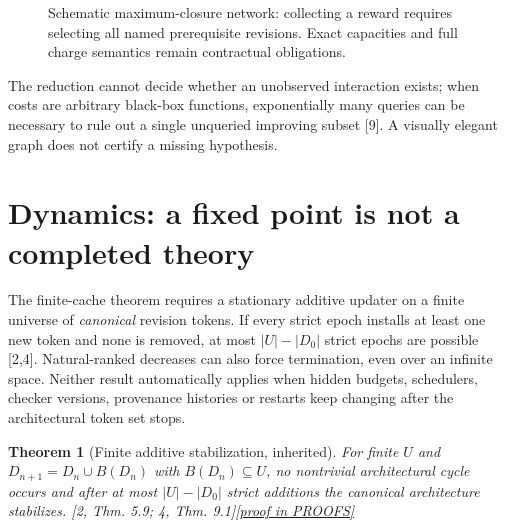 \documentclass[11pt,letterpaper]{article}
\newtheorem{theorem}{Theorem}[section]
\theoremstyle{definition}
\theoremstyle{remark}
\newcommand{\prooflink}[1]{\hfill\hyperlink{proof:#1}{\footnotesize[proof in PROOFS]}}
\newcommand{\src}[1]{\textup{[#1]}}
\begin{document}
\begin{figure}[htbp]\centering
{}
\caption{Schematic maximum-closure network: collecting a reward requires selecting all named prerequisite revisions. Exact capacities and full charge semantics remain contractual obligations.}\end{figure}

The reduction cannot decide whether an unobserved interaction exists; when costs are arbitrary black-box functions, exponentially many queries can be necessary to rule out a single unqueried improving subset \src{9}. A visually elegant graph does not certify a missing hypothesis.

\section{Dynamics: a fixed point is not a completed theory}
The finite-cache theorem requires a stationary additive updater on a finite universe of \emph{canonical} revision tokens. If every strict epoch installs at least one new token and none is removed, at most $|U|-|D_0|$ strict epochs are possible \src{2,4}. Natural-ranked decreases can also force termination, even over an infinite space. Neither result automatically applies when hidden budgets, schedulers, checker versions, provenance histories or restarts keep changing after the architectural token set stops.

\begin{theorem}[Finite additive stabilization, inherited]\label{thm:stabilize}\hypertarget{claim:stabilize}{}
For finite $U$ and $D_{n+1}=D_n\cup B(D_n)$ with $B(D_n)\subseteq U$, no nontrivial architectural cycle occurs and after at most $|U|-|D_0|$ strict additions the canonical architecture stabilizes. \src{2, Thm. 5.9; 4, Thm. 9.1}\prooflink{stabilize}
\end{theorem}
\end{document}
